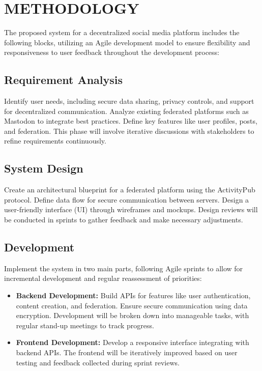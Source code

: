 \chapter{METHODOLOGY}

The proposed system for a decentralized social media platform includes the following blocks, utilizing an Agile development model to ensure flexibility and responsiveness to user feedback throughout the development process:

\section{Requirement Analysis}
Identify user needs, including secure data sharing, privacy controls, and support for decentralized communication. Analyze existing federated platforms such as Mastodon to integrate best practices. Define key features like user profiles, posts, and federation. This phase will involve iterative discussions with stakeholders to refine requirements continuously.

\section{System Design}
Create an architectural blueprint for a federated platform using the ActivityPub protocol. Define data flow for secure communication between servers. Design a user-friendly interface (UI) through wireframes and mockups. Design reviews will be conducted in sprints to gather feedback and make necessary adjustments.

\section{Development}
Implement the system in two main parts, following Agile sprints to allow for incremental development and regular reassessment of priorities:
\begin{itemize}
    \item \textbf{Backend Development:} Build APIs for features like user authentication, content creation, and federation. Ensure secure communication using data encryption. Development will be broken down into manageable tasks, with regular stand-up meetings to track progress.
    \item \textbf{Frontend Development:} Develop a responsive interface integrating with backend APIs. The frontend will be iteratively improved based on user testing and feedback collected during sprint reviews.
\end{itemize}

